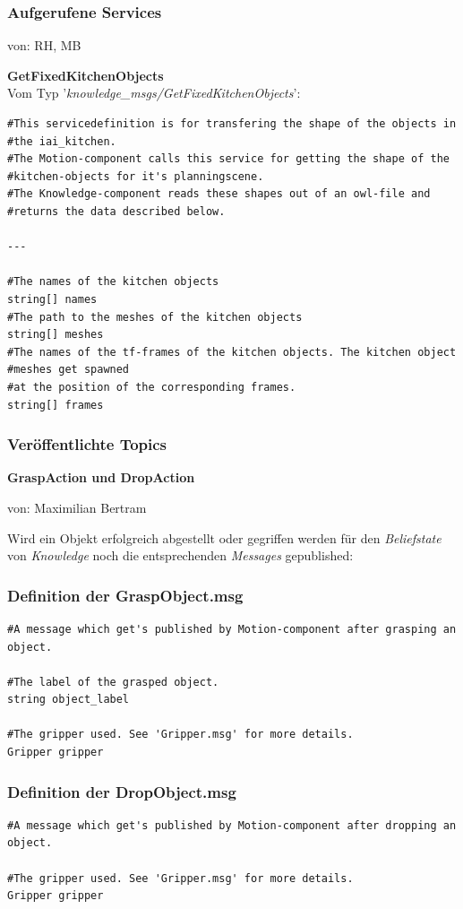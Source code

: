 \documentclass{suturo}
\makeatletter
\newcommand{\chapterauthor}[1]{%
  {\parindent0pt\vspace*{-27pt}%
  \linespread{0}\small\begin{flushright}von: #1\end{flushright}%
  \par\nobreak\vspace*{0pt}}
  \@afterheading%
}
\makeatother
\begin{document}
\subsubsection{Aufgerufene Services}
\chapterauthor{RH, MB}
\textbf{GetFixedKitchenObjects}\\
Vom Typ '\textit{knowledge\_msgs/GetFixedKitchenObjects}': \\ 
\begin{verbatim}
#This servicedefinition is for transfering the shape of the objects in
#the iai_kitchen.
#The Motion-component calls this service for getting the shape of the 
#kitchen-objects for it's planningscene.
#The Knowledge-component reads these shapes out of an owl-file and 
#returns the data described below.

---

#The names of the kitchen objects
string[] names
#The path to the meshes of the kitchen objects
string[] meshes
#The names of the tf-frames of the kitchen objects. The kitchen object 
#meshes get spawned
#at the position of the corresponding frames.
string[] frames
\end{verbatim}

\subsubsection{Veröffentlichte Topics}
\textbf{GraspAction und DropAction}
\chapterauthor{Maximilian Bertram}

Wird ein Objekt erfolgreich abgestellt oder gegriffen werden für den \textit{Beliefstate} von \textit{Knowledge} noch die entsprechenden \textit{Messages} gepublished: \\

\subsubsection*{Definition der GraspObject.msg}
\begin{verbatim}
#A message which get's published by Motion-component after grasping an object.

#The label of the grasped object.
string object_label

#The gripper used. See 'Gripper.msg' for more details.
Gripper gripper
\end{verbatim}

\subsubsection*{Definition der DropObject.msg}
\begin{verbatim}
#A message which get's published by Motion-component after dropping an object.

#The gripper used. See 'Gripper.msg' for more details.
Gripper gripper
\end{verbatim}
\end{document}

